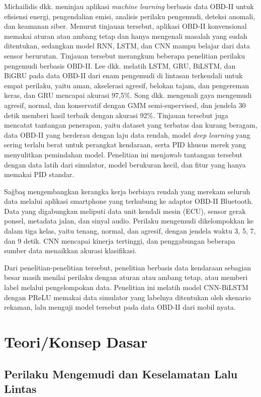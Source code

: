 Michailidis dkk. meninjau aplikasi \textit{machine learning} berbasis data OBD-II untuk efisiensi energi, pengendalian emisi, analisis perilaku pengemudi, deteksi anomali, dan keamanan siber. Menurut tinjauan tersebut, aplikasi OBD-II konvensional memakai aturan atau ambang tetap dan hanya mengenali masalah yang sudah ditentukan, sedangkan model RNN, LSTM, dan CNN mampu belajar dari data sensor berurutan. Tinjauan tersebut merangkum beberapa penelitian perilaku pengemudi berbasis OBD-II. Lee dkk. melatih LSTM, GRU, BiLSTM, dan BiGRU pada data OBD-II dari enam pengemudi di lintasan terkendali untuk empat perilaku, yaitu aman, akselerasi agresif, belokan tajam, dan pengereman keras, dan GRU mencapai akurasi 97,5\%. Song dkk. mengenali gaya mengemudi agresif, normal, dan konservatif dengan GMM semi-supervised, dan jendela 30 detik memberi hasil terbaik dengan akurasi 92\%. Tinjauan tersebut juga mencatat tantangan penerapan, yaitu dataset yang terbatas dan kurang beragam, data OBD-II yang berderau dengan laju data rendah, model \textit{deep learning} yang sering terlalu berat untuk perangkat kendaraan, serta PID khusus merek yang menyulitkan pemindahan model. Penelitian ini menjawab tantangan tersebut dengan data latih dari simulator, model berukuran kecil, dan fitur yang hanya memakai PID standar.

Sa\u{g}ba\c{s} mengembangkan kerangka kerja berbiaya rendah yang merekam seluruh data melalui aplikasi smartphone yang terhubung ke adaptor OBD-II Bluetooth. Data yang digabungkan meliputi data unit kendali mesin (ECU), sensor gerak ponsel, metadata jalan, dan sinyal audio. Perilaku mengemudi dikelompokkan ke dalam tiga kelas, yaitu tenang, normal, dan agresif, dengan jendela waktu 3, 5, 7, dan 9 detik. CNN mencapai kinerja tertinggi, dan penggabungan beberapa sumber data menaikkan akurasi klasifikasi.

Dari penelitian-penelitian tersebut, penelitian berbasis data kendaraan sebagian besar masih menilai perilaku dengan aturan atau ambang tetap, atau memberi label melalui pengelompokan data. Penelitian ini melatih model CNN-BiLSTM dengan PReLU memakai data simulator yang labelnya ditentukan oleh skenario rekaman, lalu menguji model tersebut pada data OBD-II dari mobil nyata.

\section{Teori/Konsep Dasar}
\subsection{Perilaku Mengemudi dan Keselamatan Lalu Lintas}
